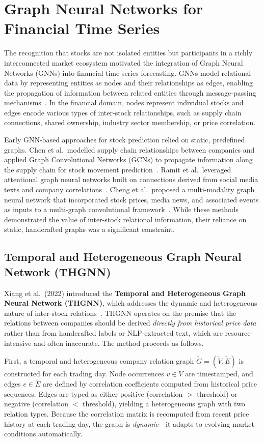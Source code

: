 \documentclass[a4paper,11pt]{report}
\begin{document}
\section{Graph Neural Networks for Financial Time Series}
\label{sec:gnn}

The recognition that stocks are not isolated entities but participants in a richly interconnected market ecosystem motivated the integration of Graph Neural Networks (GNNs) into financial time series forecasting. GNNs model relational data by representing entities as nodes and their relationships as edges, enabling the propagation of information between related entities through message-passing mechanisms~\cite{xiang2022thgnn}. In the financial domain, nodes represent individual stocks and edges encode various types of inter-stock relationships, such as supply chain connections, shared ownership, industry sector membership, or price correlation.

Early GNN-based approaches for stock prediction relied on static, predefined graphs. Chen et al.\ modelled supply chain relationships between companies and applied Graph Convolutional Networks (GCNs) to propagate information along the supply chain for stock movement prediction~\cite{xiang2022thgnn}. Ramit et al.\ leveraged attentional graph neural networks built on connections derived from social media texts and company correlations~\cite{xiang2022thgnn}. Cheng et al.\ proposed a multi-modality graph neural network that incorporated stock prices, media news, and associated events as inputs to a multi-graph convolutional framework~\cite{xiang2022thgnn}. While these methods demonstrated the value of inter-stock relational information, their reliance on static, handcrafted graphs was a significant constraint.
\subsection{Temporal and Heterogeneous Graph Neural Network (THGNN)}

Xiang et al.\ (2022) introduced the \textbf{Temporal and Heterogeneous Graph Neural Network (THGNN)}, which addresses the dynamic and heterogeneous nature of inter-stock relations~\cite{xiang2022thgnn}. THGNN operates on the premise that the relations between companies should be derived \emph{directly from historical price data} rather than from handcrafted labels or NLP-extracted text, which are resource-intensive and often inaccurate. The method proceeds as follows.

First, a temporal and heterogeneous company relation graph $\tilde{G} = (\tilde{V}, \tilde{E})$ is constructed for each trading day. Node occurrences $v \in \tilde{V}$ are timestamped, and edges $e \in \tilde{E}$ are defined by correlation coefficients computed from historical price sequences. Edges are typed as either positive (correlation $>$ threshold) or negative (correlation $<$ threshold), yielding a heterogeneous graph with two relation types. Because the correlation matrix is recomputed from recent price history at each trading day, the graph is \emph{dynamic}---it adapts to evolving market conditions automatically.
\end{document}
